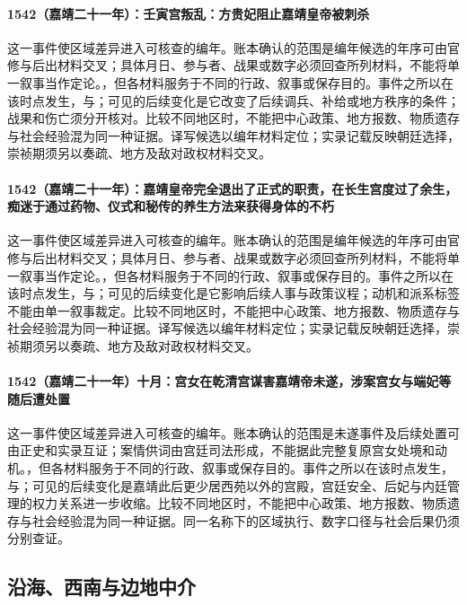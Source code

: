 \paragraph{1542（嘉靖二十一年）：壬寅宫叛乱：方贵妃阻止嘉靖皇帝被刺杀} 这一事件使区域差异进入可核查的编年。账本确认的范围是编年候选的年序可由官修与后出材料交叉；具体月日、参与者、战果或数字必须回查所列材料，不能将单一叙事当作定论。，但各材料服务于不同的行政、叙事或保存目的。事件之所以在该时点发生，与；可见的后续变化是它改变了后续调兵、补给或地方秩序的条件；战果和伤亡须分开核对。比较不同地区时，不能把中心政策、地方报数、物质遗存与社会经验混为同一种证据。译写候选以编年材料定位；实录记载反映朝廷选择，崇祯期须另以奏疏、地方及敌对政权材料交叉。

\paragraph{1542（嘉靖二十一年）：嘉靖皇帝完全退出了正式的职责，在长生宫度过了余生，痴迷于通过药物、仪式和秘传的养生方法来获得身体的不朽} 这一事件使区域差异进入可核查的编年。账本确认的范围是编年候选的年序可由官修与后出材料交叉；具体月日、参与者、战果或数字必须回查所列材料，不能将单一叙事当作定论。，但各材料服务于不同的行政、叙事或保存目的。事件之所以在该时点发生，与；可见的后续变化是它影响后续人事与政策议程；动机和派系标签不能由单一叙事裁定。比较不同地区时，不能把中心政策、地方报数、物质遗存与社会经验混为同一种证据。译写候选以编年材料定位；实录记载反映朝廷选择，崇祯期须另以奏疏、地方及敌对政权材料交叉。

\paragraph{1542（嘉靖二十一年）十月：宫女在乾清宫谋害嘉靖帝未遂，涉案宫女与端妃等随后遭处置} 这一事件使区域差异进入可核查的编年。账本确认的范围是未遂事件及后续处置可由正史和实录互证；案情供词由宫廷司法形成，不能据此完整复原宫女处境和动机。，但各材料服务于不同的行政、叙事或保存目的。事件之所以在该时点发生，与；可见的后续变化是嘉靖此后更少居西苑以外的宫殿，宫廷安全、后妃与内廷管理的权力关系进一步收缩。比较不同地区时，不能把中心政策、地方报数、物质遗存与社会经验混为同一种证据。同一名称下的区域执行、数字口径与社会后果仍须分别查证。

\subsection{沿海、西南与边地中介}

